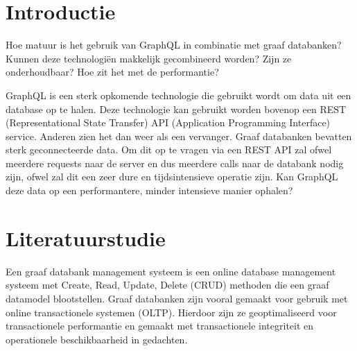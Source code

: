 
\section{Introductie} %
\label{sec:introductie}

Hoe matuur is het gebruik van GraphQL in combinatie met graaf databanken? Kunnen deze technologiën makkelijk gecombineerd worden? Zijn ze onderhoudbaar? Hoe zit het met de performantie?

GraphQL is een sterk opkomende technologie die gebruikt wordt om data uit een database op te halen. Deze technologie kan gebruikt worden bovenop een REST (Representational State Transfer) API (Application Programming Interface) service. Anderen zien het dan weer als een vervanger. 
Graaf databanken bevatten sterk geconnecteerde data. Om dit op te vragen via een REST API zal ofwel meerdere requests naar de server en dus meerdere calls naar de databank nodig zijn, ofwel zal dit een zeer dure en tijdsintensieve operatie zijn. Kan GraphQL deze data op een performantere, minder intensieve manier ophalen?



\section{Literatuurstudie}
\label{sec:state-of-the-art}

Een graaf databank management systeem is een online database management systeem met Create, Read, Update, Delete (CRUD) methoden die een graaf datamodel blootstellen. Graaf databanken zijn vooral gemaakt voor gebruik met online transactionele systemen (OLTP). Hierdoor zijn ze geoptimaliseerd voor transactionele performantie en gemaakt met transactionele integriteit en operationele beschikbaarheid in gedachten. \autocite{graphDatabases}

